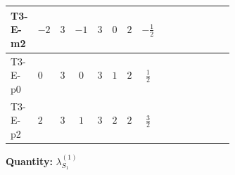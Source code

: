\documentclass[8pt]{article}
\begin{document}
\begin{landscape}
\begin{longtable}{@{}llcccccc >{\raggedright\arraybackslash}p{0.21\linewidth} >{\raggedright\arraybackslash}p{0.21\linewidth} >{\raggedright\arraybackslash}p{0.21\linewidth}@{}}
\midrule
T3-E-m2 & $-2$ & $3$ & $-1$ & $3$ & $0$ & $2$ & $-\frac{1}{2}$ & \scriptsize\adjustbox{max width=\linewidth}{$\begin{gathered} +{g_2}^2 (-24 {\lambda_{S_1}^{(1)}}-12 {\lambda_{S_1}^{(A)}})\end{gathered}$} & \scriptsize\adjustbox{max width=\linewidth}{$\begin{gathered} +\frac{3 {\lambda_{HS_1}^{(A)}}^2}{2}\end{gathered}$} & \scriptsize\adjustbox{max width=\linewidth}{$\begin{gathered} +26 {\lambda_{S_1}^{(A)}}^2\end{gathered}$} \\
\midrule
T3-E-p0 & $0$ & $3$ & $0$ & $3$ & $1$ & $2$ & $\frac{1}{2}$ & \scriptsize\adjustbox{max width=\linewidth}{$\begin{gathered} +{g_2}^2 (-24 {\lambda_{S_1}^{(1)}}-12 {\lambda_{S_1}^{(A)}})\end{gathered}$} & \scriptsize\adjustbox{max width=\linewidth}{$\begin{gathered} +\frac{3 {\lambda_{HS_1}^{(A)}}^2}{2}\end{gathered}$} & \scriptsize\adjustbox{max width=\linewidth}{$\begin{gathered} +26 {\lambda_{S_1}^{(A)}}^2\end{gathered}$} \\
\midrule
T3-E-p2 & $2$ & $3$ & $1$ & $3$ & $2$ & $2$ & $\frac{3}{2}$ & \scriptsize\adjustbox{max width=\linewidth}{$\begin{gathered} +{g_2}^2 (-24 {\lambda_{S_1}^{(1)}}-12 {\lambda_{S_1}^{(A)}})\end{gathered}$} & \scriptsize\adjustbox{max width=\linewidth}{$\begin{gathered} +\frac{3 {\lambda_{HS_1}^{(A)}}^2}{2}\end{gathered}$} & \scriptsize\adjustbox{max width=\linewidth}{$\begin{gathered} +26 {\lambda_{S_1}^{(A)}}^2\end{gathered}$} \\
\midrule
\bottomrule
\end{longtable}
\clearpage
\noindent\textbf{Quantity: }$\lambda_{S_1}^{(1)}$\par\smallskip

\end{landscape}
\end{document}
